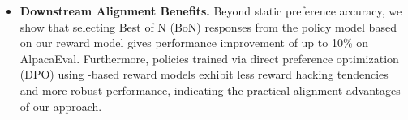 \begin{itemize}[left=2pt,itemsep=0pt]
    \item \textbf{Downstream Alignment Benefits.}
    Beyond static preference accuracy, we show that selecting Best of N (BoN)  responses from the policy model based on our reward model gives performance improvement of up to 10\% on AlpacaEval. Furthermore, policies trained via direct preference optimization (DPO) using \carma{}-based reward models exhibit less reward hacking tendencies and more robust performance, indicating the practical alignment advantages of our approach.

\end{itemize}
